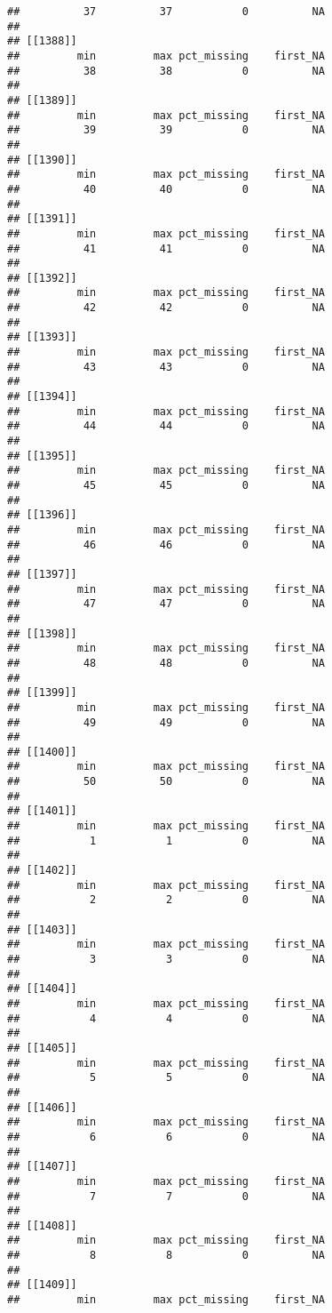 \documentclass[
]{article}
\begin{document}
\begin{verbatim}
##          37          37           0          NA 
## 
## [[1388]]
##         min         max pct_missing    first_NA 
##          38          38           0          NA 
## 
## [[1389]]
##         min         max pct_missing    first_NA 
##          39          39           0          NA 
## 
## [[1390]]
##         min         max pct_missing    first_NA 
##          40          40           0          NA 
## 
## [[1391]]
##         min         max pct_missing    first_NA 
##          41          41           0          NA 
## 
## [[1392]]
##         min         max pct_missing    first_NA 
##          42          42           0          NA 
## 
## [[1393]]
##         min         max pct_missing    first_NA 
##          43          43           0          NA 
## 
## [[1394]]
##         min         max pct_missing    first_NA 
##          44          44           0          NA 
## 
## [[1395]]
##         min         max pct_missing    first_NA 
##          45          45           0          NA 
## 
## [[1396]]
##         min         max pct_missing    first_NA 
##          46          46           0          NA 
## 
## [[1397]]
##         min         max pct_missing    first_NA 
##          47          47           0          NA 
## 
## [[1398]]
##         min         max pct_missing    first_NA 
##          48          48           0          NA 
## 
## [[1399]]
##         min         max pct_missing    first_NA 
##          49          49           0          NA 
## 
## [[1400]]
##         min         max pct_missing    first_NA 
##          50          50           0          NA 
## 
## [[1401]]
##         min         max pct_missing    first_NA 
##           1           1           0          NA 
## 
## [[1402]]
##         min         max pct_missing    first_NA 
##           2           2           0          NA 
## 
## [[1403]]
##         min         max pct_missing    first_NA 
##           3           3           0          NA 
## 
## [[1404]]
##         min         max pct_missing    first_NA 
##           4           4           0          NA 
## 
## [[1405]]
##         min         max pct_missing    first_NA 
##           5           5           0          NA 
## 
## [[1406]]
##         min         max pct_missing    first_NA 
##           6           6           0          NA 
## 
## [[1407]]
##         min         max pct_missing    first_NA 
##           7           7           0          NA 
## 
## [[1408]]
##         min         max pct_missing    first_NA 
##           8           8           0          NA 
## 
## [[1409]]
##         min         max pct_missing    first_NA 

\end{verbatim}
\end{document}
